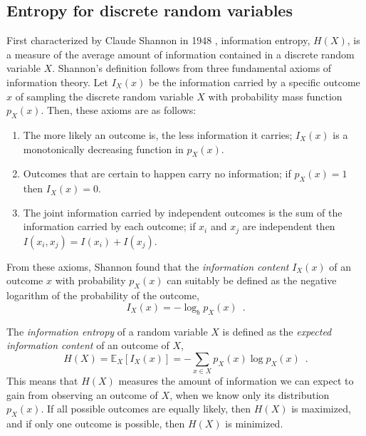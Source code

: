 \subsection{Entropy for discrete random variables}

First characterized by Claude Shannon in 1948 \cite{shannon_mathematical_1948}, information entropy, $H(X)$, is a measure of the average amount of information contained in a discrete random variable $X$. Shannon's definition follows from three fundamental axioms of information theory. Let $I_X(x)$ be the information carried by a specific outcome $x$ of sampling the discrete random variable $X$ with probability mass function $p_X(x)$. Then, these axioms are as follows:
\begin{enumerate}[label=(\Roman*)]
    \item The more likely an outcome is, the less information it carries; $I_X(x)$ is a monotonically decreasing function in $p_X(x)$.
    \item Outcomes that are certain to happen carry no information; if $p_X(x) = 1$ then $I_X(x) = 0$.
    \item The joint information carried by independent outcomes is the sum of the information carried by each outcome; if $x_i$ and $x_j$ are independent then $I(x_i, x_j) = I(x_i) + I(x_j)$. 
\end{enumerate}

From these axioms, Shannon found that the \emph{information content} $I_X(x)$ of an outcome $x$ with probability $p_X(x)$ can suitably be defined as the negative logarithm of the probability of the outcome,
%
\begin{equation} \label{eq:information-content}
    I_X(x) = -\log_b p_X(x) \enspace .
\end{equation}
%

The \emph{information entropy} of a random variable $X$ is defined as the \emph{expected information content} of an outcome of $X$,
%
\begin{equation} \label{eq:information-entropy}
    H(X) = \mathbb{E}_X\left[I_X(x)\right] = - \sum_{x\in X} p_X(x) \log p_X(x) \enspace .
\end{equation}
%
This means that $H(X)$ measures the amount of information we can expect to gain from observing an outcome of $X$, when we know only its distribution $p_X(x)$. If all possible outcomes are equally likely, then $H(X)$ is maximized, and if only one outcome is possible, then $H(X)$ is minimized.



